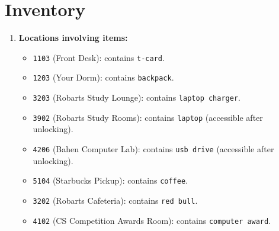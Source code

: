 \documentclass[11pt]{article}
\begin{document}
\section*{Inventory}
\begin{enumerate}
    \item \textbf{Locations involving items:}
    \begin{itemize}
        \item \texttt{1103} (Front Desk): contains \texttt{t-card}.
        \item \texttt{1203} (Your Dorm): contains \texttt{backpack}.
        \item \texttt{3203} (Robarts Study Lounge): contains \texttt{laptop charger}.
        \item \texttt{3902} (Robarts Study Rooms): contains \texttt{laptop} (accessible after unlocking).
        \item \texttt{4206} (Bahen Computer Lab): contains \texttt{usb drive} (accessible after unlocking).
        \item \texttt{5104} (Starbucks Pickup): contains \texttt{coffee}.
        \item \texttt{3202} (Robarts Cafeteria): contains \texttt{red bull}.
        \item \texttt{4102} (CS Competition Awards Room): contains \texttt{computer award}.
    \end{itemize}
    

\end{enumerate}
\end{document}
